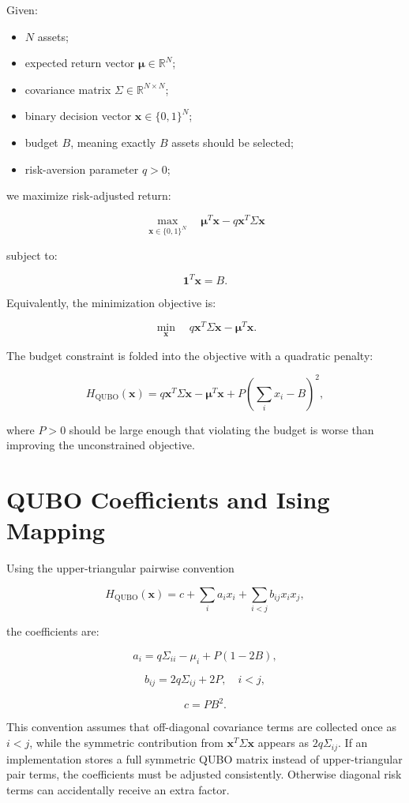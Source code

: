 \documentclass[11pt]{article}
\begin{document}
Given:

\begin{itemize}
\item \(N\) assets;
\item expected return vector \(\boldsymbol{\mu}\in\mathbb{R}^{N}\);
\item covariance matrix \(\Sigma\in\mathbb{R}^{N\times N}\);
\item binary decision vector \(\mathbf{x}\in\{0,1\}^{N}\);
\item budget \(B\), meaning exactly \(B\) assets should be selected;
\item risk-aversion parameter \(q>0\);
\end{itemize}

we maximize risk-adjusted return:

\[
\max_{\mathbf{x}\in\{0,1\}^{N}}
\quad
\boldsymbol{\mu}^{T}\mathbf{x}
-
q\mathbf{x}^{T}\Sigma\mathbf{x}
\]

subject to:

\[
\mathbf{1}^{T}\mathbf{x}=B.
\]

Equivalently, the minimization objective is:

\[
\min_{\mathbf{x}}
\quad
q\mathbf{x}^{T}\Sigma\mathbf{x}
-
\boldsymbol{\mu}^{T}\mathbf{x}.
\]

The budget constraint is folded into the objective with a quadratic penalty:

\[
H_{\mathrm{QUBO}}(\mathbf{x})
=
q\mathbf{x}^{T}\Sigma\mathbf{x}
-
\boldsymbol{\mu}^{T}\mathbf{x}
+
P\left(\sum_i x_i-B\right)^2,
\]

where \(P>0\) should be large enough that violating the budget is worse than improving the unconstrained objective.

\section{QUBO Coefficients and Ising Mapping}

Using the upper-triangular pairwise convention

\[
H_{\mathrm{QUBO}}(\mathbf{x})
=
c+
\sum_i a_i x_i+
\sum_{i<j} b_{ij}x_i x_j,
\]

the coefficients are:

\[
a_i
=
q\Sigma_{ii}-\mu_i+P(1-2B),
\]

\[
b_{ij}
=
2q\Sigma_{ij}+2P,
\quad i<j,
\]

\[
c=PB^2.
\]

This convention assumes that off-diagonal covariance terms are collected once as \(i<j\), while the symmetric contribution from \(\mathbf{x}^{T}\Sigma\mathbf{x}\) appears as \(2q\Sigma_{ij}\). If an implementation stores a full symmetric QUBO matrix instead of upper-triangular pair terms, the coefficients must be adjusted consistently. Otherwise diagonal risk terms can accidentally receive an extra factor.
\end{document}

